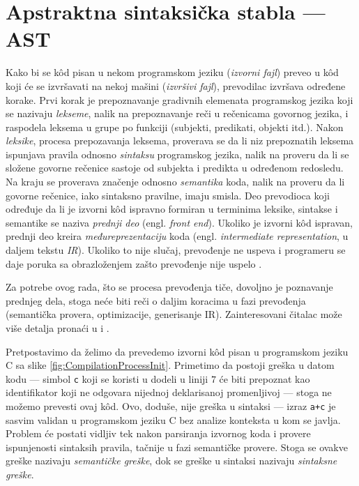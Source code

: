 \section{Apstraktna sintaksička stabla --- AST}
\label{sec:AST}

Kako bi se k\^od pisan u nekom programskom jeziku (\emph{izvorni fajl}) preveo u k\^od koji će se izvršavati na nekoj mašini (\emph{izvršivi fajl}), prevodilac izvršava određene korake. Prvi korak je prepoznavanje gradivnih elemenata programskog jezika koji se nazivaju \emph{lekseme}, nalik na prepoznavanje reči u rečenicama govornog jezika, i raspodela leksema u grupe po funkciji (subjekti, predikati, objekti itd.). Nakon \emph{leksike}, procesa prepozavanja leksema, proverava se da li niz prepoznatih leksema ispunjava pravila odnosno \emph{sintaksu} programskog jezika, nalik na proveru da li se složene govorne rečenice sastoje od subjekta i predikta u određenom redosledu. Na kraju se proverava značenje odnosno \emph{semantika} koda, nalik na proveru da li govorne rečenice, iako sintaksno pravilne, imaju smisla. Deo prevodioca koji određuje da li je izvorni k\^od ispravno formiran u terminima leksike, sintakse i semantike se naziva \emph{prednji deo} (engl. \emph{front end}). Ukoliko je izvorni k\^od ispravan, prednji deo kreira \emph{međureprezentaciju} koda (engl. \emph{intermediate representation}, u daljem tekstu \emph{IR}). Ukoliko to nije slučaj, prevođenje ne uspeva i programeru se daje poruka sa obrazloženjem zašto prevođenje nije uspelo \cite{EngineeringCompilers}.

Za potrebe ovog rada, što se procesa prevođenja tiče, dovoljno je poznavanje prednjeg dela, stoga neće biti reči o daljim koracima u fazi prevođenja (semantička provera, optimizacije, generisanje IR). Zainteresovani čitalac može više detalja pronaći u \cite{EngineeringCompilers} i \cite{CompilerConstruction}. 

Pretpostavimo da želimo da prevedemo izvorni k\^od pisan u programskom jeziku C sa slike \ref{fig:CompilationProcessInit}. Primetimo da postoji greška u datom kodu --- simbol \texttt{c} koji se koristi u dodeli u liniji $7$ će biti prepoznat kao identifikator koji ne odgovara nijednoj deklarisanoj promenljivoj --- stoga ne možemo prevesti ovaj k\^od. Ovo, doduše, nije greška u sintaksi --- izraz \texttt{a+c} je sasvim validan u programskom jeziku C bez analize konteksta u kom se javlja. Problem će postati vidljiv tek nakon parsiranja izvornog koda i provere ispunjenosti sintaksih pravila, tačnije u fazi semantičke provere. Stoga se ovakve greške nazivaju \emph{semantičke greške}, dok se greške u sintaksi nazivaju \emph{sintaksne greške}.

